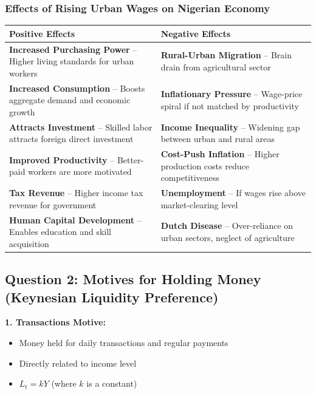 \documentclass[12pt,a4paper]{article}
\begin{document}
\subsubsection*{Effects of Rising Urban Wages on Nigerian Economy}

\begin{center}
\begin{tabular}{@{}p{6cm}p{6cm}@{}}
\toprule
\textbf{Positive Effects} & \textbf{Negative Effects} \\
\midrule
\textbf{Increased Purchasing Power} -- Higher living standards for urban workers & \textbf{Rural-Urban Migration} -- Brain drain from agricultural sector \\
\addlinespace
\textbf{Increased Consumption} -- Boosts aggregate demand and economic growth & \textbf{Inflationary Pressure} -- Wage-price spiral if not matched by productivity \\
\addlinespace
\textbf{Attracts Investment} -- Skilled labor attracts foreign direct investment & \textbf{Income Inequality} -- Widening gap between urban and rural areas \\
\addlinespace
\textbf{Improved Productivity} -- Better-paid workers are more motivated & \textbf{Cost-Push Inflation} -- Higher production costs reduce competitiveness \\
\addlinespace
\textbf{Tax Revenue} -- Higher income tax revenue for government & \textbf{Unemployment} -- If wages rise above market-clearing level \\
\addlinespace
\textbf{Human Capital Development} -- Enables education and skill acquisition & \textbf{Dutch Disease} -- Over-reliance on urban sectors, neglect of agriculture \\
\bottomrule
\end{tabular}
\end{center}


\subsection{Question 2: Motives for Holding Money (Keynesian Liquidity Preference)}

\textbf{1. Transactions Motive:}
\begin{itemize}
    \item Money held for daily transactions and regular payments
    \item Directly related to income level
    \item $L_t = kY$ (where $k$ is a constant)
\end{itemize}
\end{document}
